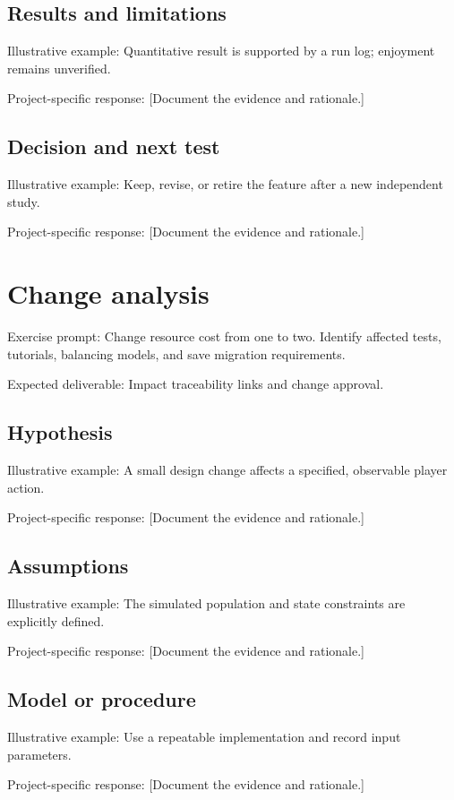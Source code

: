 \documentclass[11pt]{article}
\begin{document}
\subsection{Results and limitations}
Illustrative example: Quantitative result is supported by a run log; enjoyment remains unverified.

Project-specific response: [Document the evidence and rationale.]


\subsection{Decision and next test}
Illustrative example: Keep, revise, or retire the feature after a new independent study.

Project-specific response: [Document the evidence and rationale.]


\section{Change analysis}
Exercise prompt: Change resource cost from one to two. Identify affected tests, tutorials, balancing models, and save migration requirements.

Expected deliverable: Impact traceability links and change approval.


\subsection{Hypothesis}
Illustrative example: A small design change affects a specified, observable player action.

Project-specific response: [Document the evidence and rationale.]


\subsection{Assumptions}
Illustrative example: The simulated population and state constraints are explicitly defined.

Project-specific response: [Document the evidence and rationale.]


\subsection{Model or procedure}
Illustrative example: Use a repeatable implementation and record input parameters.

Project-specific response: [Document the evidence and rationale.]
\end{document}
